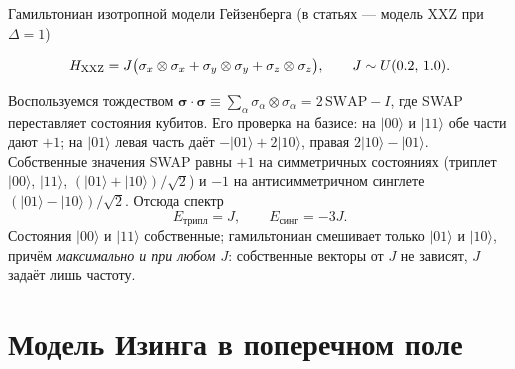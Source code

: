 \documentclass[12pt,a4paper]{report}
\numberwithin{equation}{chapter}
\newcommand{\ket}[1]{|#1\rangle}
\begin{document}
Гамильтониан изотропной модели Гейзенберга (в статьях --- модель XXZ при
$\Delta=1$)
\begin{keybox}
\begin{equation}
H_{\rm XXZ}=J\bigl(\sigma_x\otimes\sigma_x+\sigma_y\otimes\sigma_y+\sigma_z\otimes\sigma_z\bigr),
\qquad J\sim U(0.2,\,1.0).
\end{equation}
\end{keybox}
Воспользуемся тождеством $\boldsymbol\sigma\cdot\boldsymbol\sigma\equiv
\sum_\alpha\sigma_\alpha\otimes\sigma_\alpha=2\,\mathrm{SWAP}-I$, где SWAP
переставляет состояния кубитов. Его проверка на базисе: на $\ket{00}$ и
$\ket{11}$ обе части дают $+1$; на $\ket{01}$ левая часть даёт
$-\ket{01}+2\ket{10}$, правая $2\ket{10}-\ket{01}$. Собственные значения SWAP
равны $+1$ на симметричных состояниях (триплет $\ket{00}$, $\ket{11}$,
$(\ket{01}+\ket{10})/\sqrt2$) и $-1$ на антисимметричном синглете
$(\ket{01}-\ket{10})/\sqrt2$. Отсюда спектр
\begin{equation}
E_{\text{трипл}}=J,\qquad E_{\text{синг}}=-3J .
\end{equation}
Состояния $\ket{00}$ и $\ket{11}$ собственные; гамильтониан смешивает только
$\ket{01}$ и $\ket{10}$, причём \emph{максимально и при любом $J$}: собственные
векторы от $J$ не зависят, $J$ задаёт лишь частоту.

\section{Модель Изинга в поперечном поле}
\end{document}
